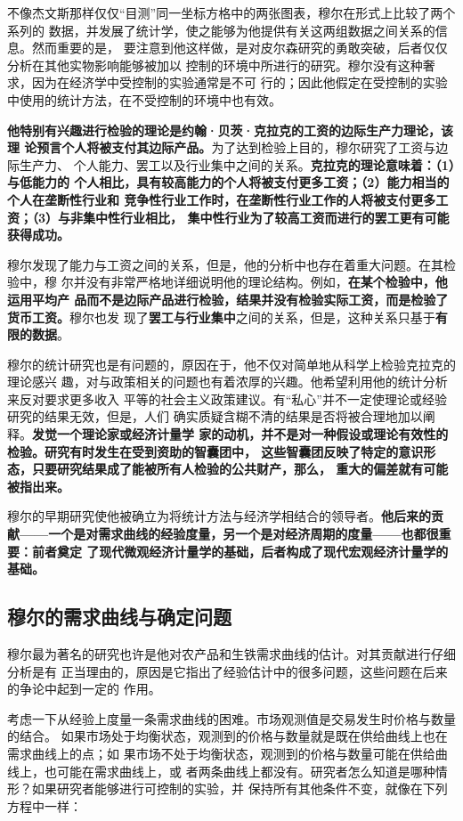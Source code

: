 不像杰文斯那样仅仅“目测”同一坐标方格中的两张图表，穆尔在形式上比较了两个系列的
数据，并发展了统计学，使之能够为他提供有关这两组数据之间关系的信息。然而重要的是，
要注意到他这样做，是对皮尔森研究的勇敢突破，后者仅仅分析在其他实物影响能够被加以
控制的环境中所进行的研究。穆尔没有这种奢求，因为在经济学中受控制的实验通常是不可
行的；因此他假定在受控制的实验中使用的统计方法，在不受控制的环境中也有效。

\textbf{他特别有兴趣进行检验的理论是约翰·贝茨·克拉克的工资的边际生产力理论，该理
  论预言个人将被支付其边际产品。}为了达到检验上目的，穆尔研究了工资与边际生产力、
个人能力、罢工以及行业集中之间的关系。\textbf{克拉克的理论意味着：（1）与低能力的
  个人相比，具有较高能力的个人将被支付更多工资；（2）能力相当的个人在垄断性行业和
  竞争性行业工作时，在垄断性行业工作的人将被支付更多工资；（3）与非集中性行业相比，
  集中性行业为了较高工资而进行的罢工更有可能获得成功。}

穆尔发现了能力与工资之间的关系，但是，他的分析中也存在着重大问题。在其检验中，穆
尔并没有非常严格地详细说明他的理论结构。例如，\textbf{在某个检验中，他运用平均产
  品而不是边际产品进行检验，结果并没有检验实际工资，而是检验了货币工资。}穆尔也发
现了\textbf{罢工与行业集中}之间的关系，但是，这种关系只基于\textbf{有限的数据}。

穆尔的统计研究也是有问题的，原因在于，他不仅对简单地从科学上检验克拉克的理论感兴
趣，对与政策相关的问题也有着浓厚的兴趣。他希望利用他的统计分析来反对要求更多收入
平等的社会主义政策建议。有“私心”并不一定使理论或经验研究的结果无效，但是，人们
确实质疑含糊不清的结果是否将被合理地加以阐释。\textbf{发觉一个理论家或经济计量学
  家的动机，并不是对一种假设或理论有效性的检验。研究有时发生在受到资助的智囊团中，
  这些智囊团反映了特定的意识形态，只要研究结果成了能被所有人检验的公共财产，那么，
  重大的偏差就有可能被指出来。}

穆尔的早期研究使他被确立为将统计方法与经济学相结合的领导者。\textbf{他后来的贡
  献——一个是对需求曲线的经验度量，另一个是对经济周期的度量——也都很重要：前者奠定
  了现代微观经济计量学的基础，后者构成了现代宏观经济计量学的基础。}

\subsection{穆尔的需求曲线与确定问题}

穆尔最为著名的研究也许是他对农产品和生铁需求曲线的估计。对其贡献进行仔细分析是有
正当理由的，原因是它指出了经验估计中的很多问题，这些问题在后来的争论中起到一定的
作用。

考虑一下从经验上度量一条需求曲线的困难。市场观测值是交易发生时价格与数量的结合。
如果市场处于均衡状态，观测到的价格与数量就是既在供给曲线上也在需求曲线上的点；如
果市场不处于均衡状态，观测到的价格与数量可能在供给曲线上，也可能在需求曲线上，或
者两条曲线上都没有。研究者怎么知道是哪种情形？如果研究者能够进行可控制的实验，并
保持所有其他条件不变，就像在下列方程中一样：

